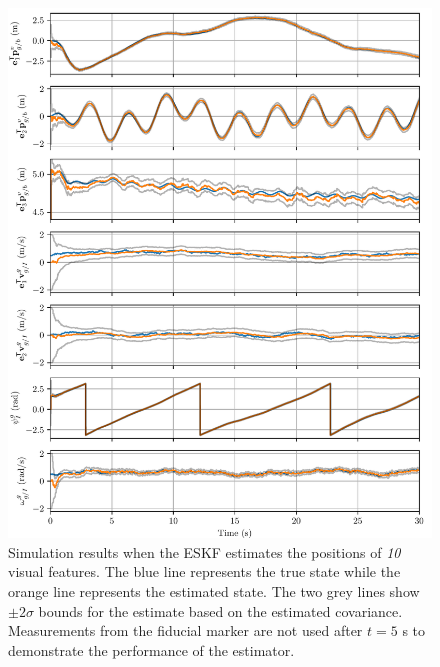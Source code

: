 \begin{figure}
  \centering
  \includegraphics[width=6.5in]{plots/single_run_with_lms}
  \caption[ESKF Simulation Results Using 10 Visual Features]{Simulation results when the ESKF estimates the positions of \emph{10} visual
  features. The blue line represents the true state while the orange line
  represents the estimated state. The two grey lines show $\pm 2 \sigma$ bounds for
  the estimate based on the estimated covariance. Measurements from the fiducial
  marker are not used after $t = 5$ s
  to demonstrate the performance of the estimator.}
  \label{fig:with_lms}
\end{figure}



